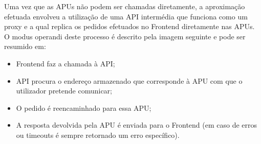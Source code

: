 \hfill\break
Uma vez que as APUs não podem ser chamadas diretamente, a aproximação efetuada envolveu a utilização de uma API intermédia que funciona como um proxy e a qual replica os pedidos efetuados no Frontend diretamente nas APUs.\newline
O modus operandi deste processo é descrito pela imagem seguinte e pode ser resumido em:
\begin{itemize}[noitemsep]
    \item Frontend faz a chamada à API;
    \item API procura o endereço armazenado que corresponde à APU com que o utilizador pretende comunicar;
    \item O pedido é reencaminhado para essa APU;
    \item A resposta devolvida pela APU é enviada para o Frontend (em caso de erros ou timeouts é sempre retornado um erro específico).
\end{itemize}

